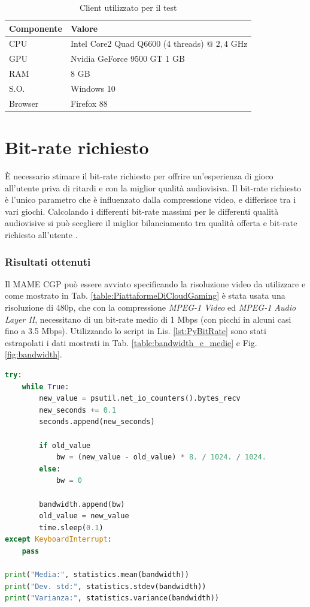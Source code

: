 \begin{table}[H]
	\centering
	\begin{tabular}{||l l||}
		\hline
		Componente & Valore \\
		\hline\hline				
		\hline
		CPU & Intel Core2 Quad Q6600 (4 threads) @ $2,4$ GHz \\
		\hline
		GPU & Nvidia GeForce 9500 GT 1 GB\\
		\hline
		RAM & 8 GB \\		
		\hline
		S.O. & Windows 10 \\
		\hline
		Browser & Firefox 88 \\
		\hline
	\end{tabular}

	\caption{Client utilizzato per il test}
	\label{table:ClientUsato}
\end{table}




\section{Bit-rate richiesto}
È necessario stimare il bit-rate richiesto per offrire un'esperienza di gioco all'utente priva di ritardi e con la miglior qualità audiovisiva. Il bit-rate richiesto è l'unico parametro che è influenzato dalla compressione video, e differisce tra i vari giochi. Calcolando i differenti bit-rate massimi per le differenti qualità audiovisive si può scegliere il miglior bilanciamento tra qualità offerta e bit-rate richiesto all'utente \parencite{ChenKuanTa2014OtQo}.

\subsubsection{Risultati ottenuti}
Il MAME CGP può essere avviato specificando la risoluzione video da utilizzare e come mostrato in Tab. \ref{table:PiattaformeDiCloudGaming} è stata usata una risoluzione di 480p, che con la compressione \textit{MPEG-1 Video} ed \textit{MPEG-1 Audio Layer II}, necessitano di un bit-rate medio di 1 Mbps (con picchi in alcuni casi fino a 3.5 Mbps). Utilizzando lo script in Lis. \ref{lst:PyBitRate} sono stati estrapolati i dati mostrati in Tab. \ref{table:bandwidth_e_medie} e Fig. \ref{fig:bandwidth}.

\begin{lstlisting}[language=Python, caption=Script Python per il calcolo del bit-rate richiesto, label={lst:PyBitRate}]
try:
	while True:
		new_value = psutil.net_io_counters().bytes_recv
		new_seconds += 0.1
		seconds.append(new_seconds)

		if old_value
			bw = (new_value - old_value) * 8. / 1024. / 1024.
		else:
			bw = 0

		bandwidth.append(bw)
		old_value = new_value
		time.sleep(0.1)
except KeyboardInterrupt:
	pass

print("Media:", statistics.mean(bandwidth))
print("Dev. std:", statistics.stdev(bandwidth))
print("Varianza:", statistics.variance(bandwidth))
\end{lstlisting}

